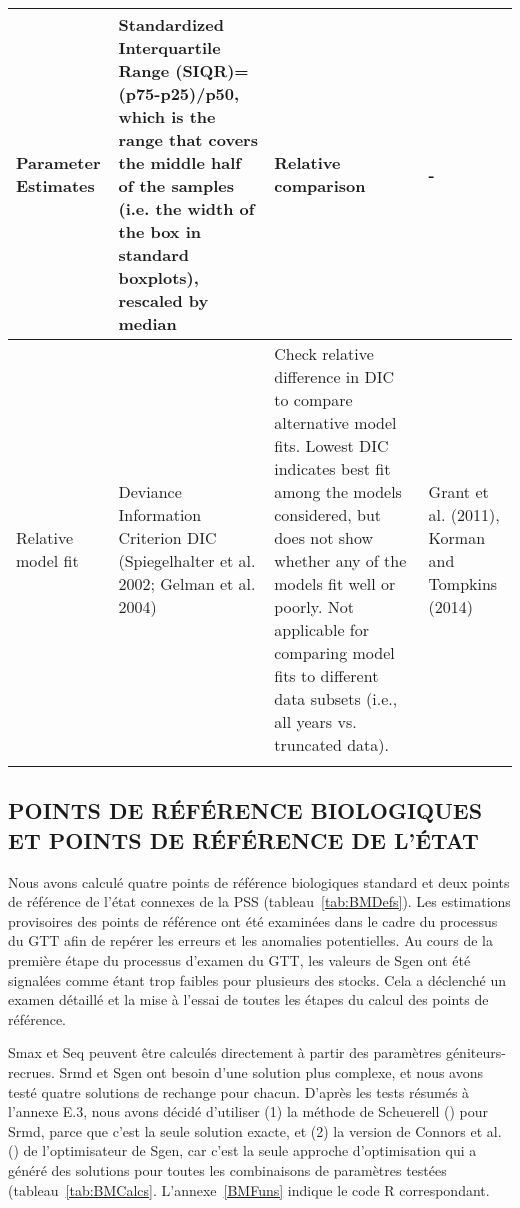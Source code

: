 \documentclass[french,11pt]{book}
\begin{document}
\begin{longtable}[t]{>{\raggedright\arraybackslash}p{7em}>{\raggedright\arraybackslash}p{10em}>{\raggedright\arraybackslash}p{17em}>{\raggedright\arraybackslash}p{5em}}
\midrule Parameter Estimates & Standardized Interquartile Range (SIQR)= (p75-p25)/p50, which is the range that covers the middle half of the samples (i.e. the width of the box in standard boxplots), rescaled by median & Relative comparison & -\\
\midrule Relative model fit & Deviance Information Criterion DIC (Spiegelhalter et al. 2002; Gelman et al. 2004) & Check relative difference in DIC to compare alternative model fits. Lowest DIC indicates best fit among the models considered, but does not show whether any of the models fit well or poorly. Not applicable for comparing model fits to different data subsets (i.e., all years vs. truncated data). & Grant et al. (2011), Korman and Tompkins (2014)\\* \end{longtable}

\endgroup{} \endgroup{}

\clearpage

\subsection{POINTS DE RÉFÉRENCE BIOLOGIQUES ET POINTS DE RÉFÉRENCE DE L'ÉTAT}\label{BMMethods}

Nous avons calculé quatre points de référence biologiques standard et deux points de référence de l'état connexes de la PSS (tableau~\ref{tab:BMDefs}). Les estimations provisoires des points de référence ont été examinées dans le cadre du processus du GTT afin de repérer les erreurs et les anomalies potentielles. Au cours de la première étape du processus d'examen du GTT, les valeurs de Sgen ont été signalées comme étant trop faibles pour plusieurs des stocks. Cela a déclenché un examen détaillé et la mise à l'essai de toutes les étapes du calcul des points de référence.

Smax et Seq peuvent être calculés directement à partir des paramètres géniteurs-recrues. Srmd et Sgen ont besoin d'une solution plus complexe, et nous avons testé quatre solutions de rechange pour chacun. D'après les tests résumés à l'annexe E.3, nous avons décidé d'utiliser (1) la méthode de Scheuerell () pour Srmd, parce que c'est la seule solution exacte, et (2) la version de Connors et al. () de l'optimisateur de Sgen, car c'est la seule approche d'optimisation qui a généré des solutions pour toutes les combinaisons de paramètres testées (tableau~\ref{tab:BMCalcs}. L'annexe~\ref{BMFuns} indique le code R correspondant.
\end{document}
